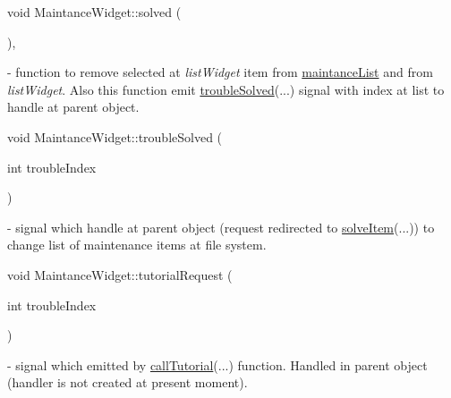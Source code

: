 \mbox{\label{classMaintanceWidget_ae0e57574f94ec4b744247d15ff8a4891}} 
{\footnotesize\ttfamily void Maintance\+Widget\+::\texorpdfstring{solved}{solved} (\begin{DoxyParamCaption}{ }\end{DoxyParamCaption})\hspace{0.3cm}{\ttfamily [private]}, {\ttfamily [slot]}} - function to remove selected at \textit{list\+Widget} item from \hyperlink{classMaintanceWidget_a9c9003f07e28f258c99b996c3c02da45}{maintance\+List} and from \textit{list\+Widget}. Also this function emit \hyperlink{classMaintanceWidget_a311671167a33d7d84a105c5b68c3c783}{trouble\+Solved}(...) signal with index at list to handle at parent object.

\mbox{\label{classMaintanceWidget_a311671167a33d7d84a105c5b68c3c783}} 
{\footnotesize\ttfamily void Maintance\+Widget\+::\texorpdfstring{trouble\+Solved}{troubleSolved} (\begin{DoxyParamCaption}\item[{int}]{trouble\+Index }\end{DoxyParamCaption})\hspace{0.3cm}{\ttfamily [signal]}} - signal which handle at parent object (request redirected to \hyperlink{classMaintanceDialog_a3958b309d854fcd5baf39fc166a6b5f6}{solve\+Item}(...)) to change list of maintenance items at file system.

\mbox{\label{classMaintanceWidget_a94a81d4c917de6cc0dba1135ab3be43e}} 
{\footnotesize\ttfamily void Maintance\+Widget\+::\texorpdfstring{tutorial\+Request}{tutorialRequest} (\begin{DoxyParamCaption}\item[{int}]{trouble\+Index }\end{DoxyParamCaption})\hspace{0.3cm}{\ttfamily [signal]}} - signal which emitted by \hyperlink{classMaintanceWidget_adc20de8af45f910289c60d1f6656e783}{call\+Tutorial}(...) function. Handled in parent object (handler is not created at present moment).



